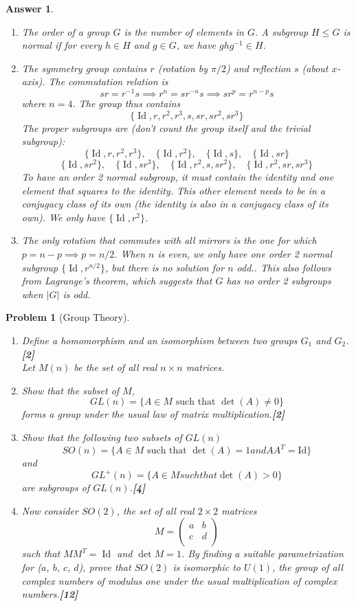 \documentclass[a4paper]{article}
\DeclareMathOperator{\Id}{Id}
\newtheorem{ans}{Answer}[section]
\theoremstyle{new}
\newtheorem{qns}{Problem}[section]
\begin{document}
\begin{ans}\leavevmode
\begin{enumerate}[label=(\roman*)]
\item The order of a group $G$ is the number of elements in $G$. A subgroup $H\leq G$ is normal if for every $h\in H$ and $g\in G$, we have $ghg^{-1}\in H$.
\item The symmetry group contains $r$ (rotation by $\pi/2$) and reflection $s$ (about $x$-axis). The commutation relation is $$sr=r^{-1}s\implies r^n=sr^{-n}s\implies sr^p=r^{n-p}s$$
where $n=4$. The group thus contains 
$$\{\Id,r,r^2,r^3,s,sr,sr^2,sr^3\}$$
The proper subgroups are (don't count the group itself and the trivial subgroup): $$\{\Id,r,r^2,r^3\},\quad\{\Id,r^2\},\quad\{\Id,s\},\quad\{\Id,sr\}$$
$$\{\Id,sr^2\},\quad\{\Id,sr^3\},\quad\{\Id,r^2,s,sr^2\},\quad\{\Id,r^2,sr,sr^3\}$$
To have an order 2 normal subgroup, it must contain the identity and one element that squares to the identity. This other element needs to be in a conjugacy class of its own (the identity is also in a conjugacy class of its own). We only have $\{\Id,r^2\}$.
\item The only rotation that commutes with all mirrors is the one for which $p=n-p\implies p=n/2$. When $n$ is even, we only have one order 2 normal subgroup $\{\Id,r^{n/2}\}$, but there is no solution for $n$ odd.. This also follows from Lagrange's theorem, which suggests that $G$ has no order 2 subgroups when $|G|$ is odd.
\end{enumerate}
\end{ans}
\newpage
\begin{qns}[Group Theory]\leavevmode
\begin{enumerate}[label=(\roman*)]
\item Define a homomorphism and an isomorphism between two groups $G_1$ and $G_2$.\hfill\textbf{[2]}\\[5pt]
Let $M(n)$ be the set of all real $n\times n$ matrices.
\item Show that the subset of $M$,
$$GL(n) = \{A \in M \text{  such that }\det(A)\neq 0\}$$
forms a group under the usual law of matrix multiplication.\hfill\textbf{[2]}
\item Show that the following two subsets of $GL(n)$
$$SO(n) = \{A \in M\text{  such that }\det(A) = 1 and AA^T = \text{Id}\}$$
and
$$GL^+(n) = \{A \in M such that \det(A) > 0\}$$
are subgroups of $GL(n)$.\hfill\textbf{[4]}
\item Now consider $SO(2)$, the set of all real $2\times 2$ matrices
$$M=\begin{pmatrix}a&b\\c&d\\\end{pmatrix}$$
such that $MM^T = \Id$ and $\det M = 1$. By finding a suitable parametrization for ($a$, $b$, $c$, $d$), prove that $SO(2)$ is isomorphic to $U(1)$, the group of all complex numbers of modulus one under the usual multiplication of complex numbers.\hfill\textbf{[12]}
\end{enumerate}
\end{qns}
\end{document}
